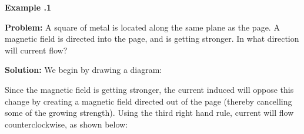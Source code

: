 	\begin{mdframed}[backgroundcolor=blue!10!white]
		\begin{center}
			
			
			\textbf{Example \thesection.1}	
		\end{center}
		
		\textbf{Problem: }A square of metal is located along the same plane as the page.  A magnetic field is directed into the page, and is getting stronger.  In what direction will current flow?  
		
		\textbf{Solution:} We begin by drawing a diagram:
		
		\begin{center}
		\end{center}
		
Since the magnetic field is getting stronger, the current induced will oppose this change by creating a magnetic field directed out of the page (thereby cancelling some of the growing strength).  Using the third right hand rule, current will flow counterclockwise, as shown below: 
	
	
		\begin{center}
	\end{center}

	\end{mdframed}
	
